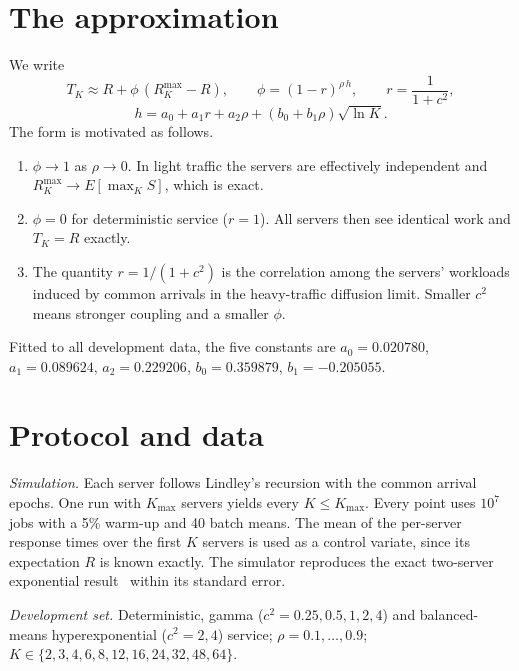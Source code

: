 \documentclass[11pt]{article}
\begin{document}
\section{The approximation}

We write
\begin{equation}
T_K\approx R+\phi\,(R^{\max}_K-R),\qquad \phi=(1-r)^{\rho\,h},\qquad r=\frac{1}{1+c^2}, \label{eq:main}
\end{equation}
\begin{equation}
h=a_0+a_1r+a_2\rho+(b_0+b_1\rho)\sqrt{\ln K}. \label{eq:h}
\end{equation}
The form is motivated as follows.
\begin{enumerate}
\item $\phi\to1$ as $\rho\to0$. In light traffic the servers are effectively independent and $R^{\max}_K\to
E[\max_K S]$, which is exact.
\item $\phi=0$ for deterministic service ($r=1$). All servers then see identical work and $T_K=R$ exactly.
\item The quantity $r=1/(1+c^2)$ is the correlation among the servers' workloads induced by common arrivals in the
heavy-traffic diffusion limit. Smaller $c^2$ means stronger coupling and a smaller $\phi$.
\end{enumerate}
Fitted to all development data, the five constants are
$a_0=0.020780$, $a_1=0.089624$, $a_2=0.229206$, $b_0=0.359879$, $b_1=-0.205055$.

\section{Protocol and data}

\textit{Simulation.} Each server follows Lindley's recursion with the common arrival epochs. One run with $K_{\max}$
servers yields every $K\le K_{\max}$. Every point uses $10^7$ jobs with a 5\% warm-up and 40 batch means. The mean of
the per-server response times over the first $K$ servers is used as a control variate, since its expectation $R$ is
known exactly. The simulator reproduces the exact two-server exponential result~\cite{FlattoHahn1984} within its
standard error.

\textit{Development set.} Deterministic, gamma ($c^2=0.25,0.5,1,2,4$) and balanced-means hyperexponential
($c^2=2,4$) service; $\rho=0.1,\dots,0.9$; $K\in\{2,3,4,6,8,12,16,24,32,48,64\}$.
\end{document}
